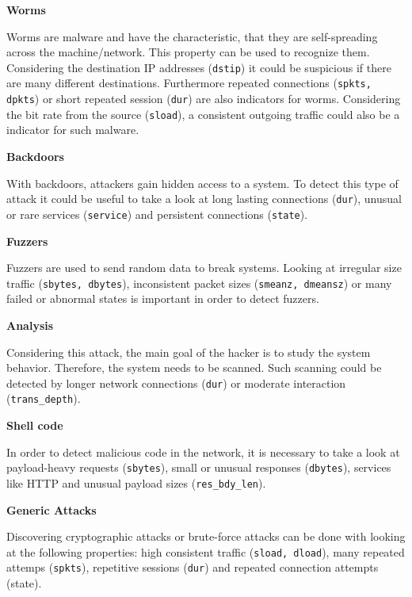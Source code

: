 \vspace{4mm}
\nextparagraph
\textbf{Worms}

\nextparagraph
Worms are malware and have the characteristic, that they are self-spreading across the machine/network. This property can be used to recognize them. Considering the destination IP addresses (\texttt{dstip}) it could be suspicious if there are many different destinations. Furthermore repeated connections (\texttt{spkts, dpkts}) or short repeated session (\texttt{dur}) are also indicators for worms. Considering the bit rate from the source (\texttt{sload}), a consistent outgoing traffic could also be a indicator for such malware.

\vspace{4mm}
\nextparagraph
\textbf{Backdoors}

\nextparagraph
With backdoors, attackers gain hidden access to a system. To detect this type of attack it could be useful to take a look at long lasting connections (\texttt{dur}), unusual or rare services (\texttt{service}) and persistent connections (\texttt{state}).

\vspace{4mm}
\nextparagraph
\textbf{Fuzzers}

\nextparagraph
Fuzzers are used to send random data to break systems. Looking at irregular size traffic (\texttt{sbytes, dbytes}), inconsistent packet sizes (\texttt{smeanz, dmeansz}) or many failed or abnormal states is important in order to detect fuzzers.

\vspace{4mm}
\nextparagraph
\textbf{Analysis}

\nextparagraph
Considering this attack, the main goal of the hacker is to study the system behavior. Therefore, the system needs to be scanned. Such scanning could be detected by longer network connections (\texttt{dur}) or moderate interaction (\texttt{trans\_depth}).

\vspace{4mm}
\nextparagraph
\textbf{Shell code}

\nextparagraph
In order to detect malicious code in the network, it is necessary to take a look at payload-heavy requests (\texttt{sbytes}), small or unusual responses (\texttt{dbytes}), services like HTTP and unusual payload sizes (\texttt{res\_bdy\_len}).

\vspace{4mm}
\nextparagraph
\textbf{Generic Attacks}

\nextparagraph
Discovering cryptographic attacks or brute-force attacks can be done with looking at the following properties: high consistent traffic (\texttt{sload, dload}), many repeated attemps (\texttt{spkts}), repetitive sessions (\texttt{dur}) and repeated connection attempts (state). 


